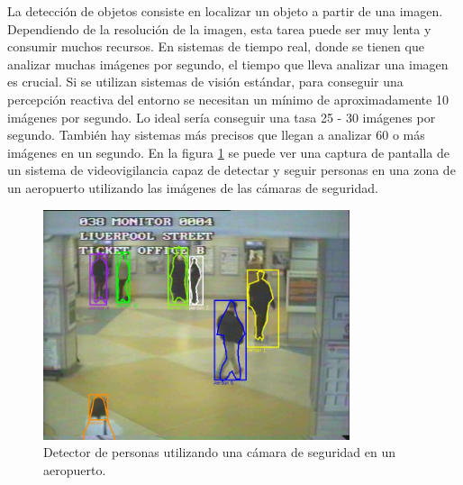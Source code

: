 La detección de objetos consiste en localizar un objeto a partir de una imagen. Dependiendo de la resolución de la imagen, esta tarea puede ser muy lenta y consumir muchos recursos. En sistemas de tiempo real, donde se tienen que analizar muchas imágenes por segundo, el tiempo que lleva analizar una imagen es crucial. Si se utilizan sistemas de visión estándar, para conseguir una percepción reactiva del entorno se necesitan un mínimo de aproximadamente 10 imágenes por segundo. Lo ideal sería conseguir una tasa 25 - 30 imágenes por segundo. También hay sistemas más precisos que 
llegan a analizar 60 o más imágenes en un segundo. En la figura \ref{fig:tracking-people} se puede ver una captura de pantalla de un sistema de videovigilancia capaz de detectar y seguir personas en una zona de un aeropuerto utilizando las imágenes de las cámaras de seguridad.\\

\begin{figure} [h]
  \begin{center}
    \includegraphics[width=9cm]{img/cap1/tracking-people}
  \end{center}
  \caption{Detector de personas utilizando una cámara de seguridad en un aeropuerto.}
  \label{fig:tracking-people}
\end{figure}

